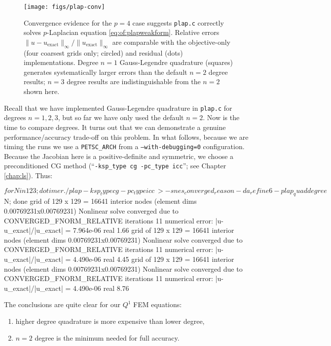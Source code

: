 \begin{figure}
\texttt{[image: figs/plap-conv]}
\caption{Convergence evidence for the $p=4$ case suggests \texttt{plap.c} correctly solves $p$-Laplacian equation \eqref{eq:of:plapweakform}.  Relative errors $\|u-u_{\text{exact}}\|_\infty / \|u_{\text{exact}}\|_\infty$ are comparable with the objective-only (four coarsest grids only; circled) and residual (dots) implementations.  Degree $n=1$ Gauss-Legendre quadrature (squares) generates systematically larger errors than the default $n=2$ degree results; $n=3$ degree results are indistinguishable from the $n=2$ shown here.}
\label{fig:of:plap-conv}
\end{figure}

Recall that we have implemented Gauss-Legendre quadrature in \texttt{plap.c} for degrees $n=1,2,3$, but so far we have only used the default $n=2$.  Now is the time to compare degrees.  It turns out that we can demonstrate a genuine performance/accuracy trade-off on this problem.  In what follows, because we are timing the runs we use a \texttt{PETSC\_ARCH} from a \texttt{--with-debugging=0} configuration.  Because the Jacobian here is a positive-definite and symmetric, we choose a preconditioned CG method (``\texttt{-ksp\_type cg -pc\_type icc}''; see Chapter \ref{chap:ls}).  Thus:
\begin{cline}
$ for N in 1 2 3; do timer ./plap -ksp_type cg -pc_type icc \
>   -snes_converged_reason -da_refine 6 -plap_quaddegree $N; done
grid of 129 x 129 = 16641 interior nodes (element dims 0.00769231x0.00769231)
Nonlinear solve converged due to CONVERGED_FNORM_RELATIVE iterations 11
numerical error:  |u-u_exact|/|u_exact| = 7.964e-06
real 1.66
grid of 129 x 129 = 16641 interior nodes (element dims 0.00769231x0.00769231)
Nonlinear solve converged due to CONVERGED_FNORM_RELATIVE iterations 11
numerical error:  |u-u_exact|/|u_exact| = 4.490e-06
real 4.45
grid of 129 x 129 = 16641 interior nodes (element dims 0.00769231x0.00769231)
Nonlinear solve converged due to CONVERGED_FNORM_RELATIVE iterations 11
numerical error:  |u-u_exact|/|u_exact| = 4.490e-06
real 8.76
\end{cline}
The conclusions are quite clear for our $Q^1$ FEM equations:
\renewcommand{\labelenumi}{\emph{(\roman{enumi})}}
\begin{enumerate}
\item higher degree quadrature is more expensive than lower degree,
\item $n=2$ degree is the minimum needed for full accuracy.
\end{enumerate}

